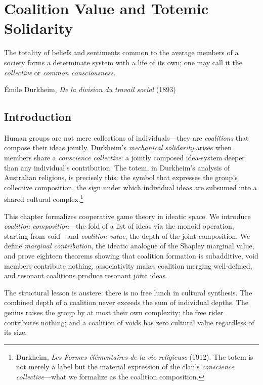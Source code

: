 
\chapter{Coalition Value and Totemic Solidarity}
\label{ch:coalition}

\epigraph{The totality of beliefs and sentiments common to the average members
of a society forms a determinate system with a life of its own; one may call it
the \emph{collective} or \emph{common consciousness.}}{Émile Durkheim,
\textit{De la division du travail social} (1893)}

\section{Introduction}

Human groups are not mere collections of individuals---they are
\emph{coalitions} that compose their ideas jointly.  Durkheim's
\emph{mechanical solidarity} arises when members share a
\emph{conscience collective}: a jointly composed idea-system deeper than
any individual's contribution.  The totem, in Durkheim's analysis of
Australian religions, is precisely this: the symbol that expresses the
group's collective composition, the sign under which individual ideas are
subsumed into a shared cultural complex.\footnote{Durkheim,
\textit{Les Formes élémentaires de la vie religieuse} (1912).  The totem
is not merely a label but the material expression of the clan's
\emph{conscience collective}---what we formalize as the coalition composition.}

This chapter formalizes cooperative game theory in ideatic space.  We
introduce \emph{coalition composition}---the fold of a list of ideas via
the monoid operation, starting from void---and \emph{coalition value},
the depth of the joint composition.  We define \emph{marginal contribution},
the ideatic analogue of the Shapley marginal value, and prove eighteen
theorems showing that coalition formation is subadditive, void members
contribute nothing, associativity makes coalition merging well-defined, and
resonant coalitions produce resonant joint ideas.

The structural lesson is austere: there is no free lunch in cultural
synthesis.  The combined depth of a coalition never exceeds the sum of
individual depths.  The genius raises the group by at most their own
complexity; the free rider contributes nothing; and a coalition of voids
has zero cultural value regardless of its size.

